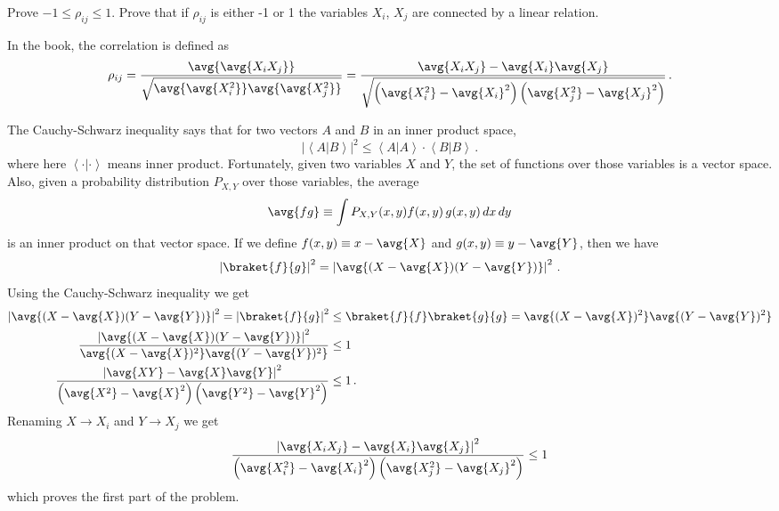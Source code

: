 

Prove $-1 \leq \rho_{ij} \leq 1$.
Prove that if $\rho_{ij}$ is either -1 or 1 the variables $X_i$, $X_j$ are connected by a linear relation.

In the book, the correlation is defined as
\begin{equation*}
\rho_{ij}
= \frac{\avg{\avg{X_i X_j}}}{\sqrt{\avg{\avg{X_i^2}} \avg{\avg{X_j^2}}}}
= \frac{\avg{X_i X_j}
- \avg{X_i}\avg{X_j}}{
\sqrt{\left(\avg{X_i^2} - \avg{X_i}^2 \right) \left( \avg{X_j^2} - \avg{X_j}^2 \right)}
} \, .
\end{equation*}


The Cauchy-Schwarz inequality says that for two vectors $A$ and $B$ in an inner product space,
\begin{equation*}
\left\lvert \left \langle A | B \right \rangle \right\vert ^2
\leq \left\langle A | A \right\rangle \cdot \left\langle B | B \right\rangle \, .
\end{equation*}
where here $\left \langle \cdot | \cdot \right \rangle$ means inner product.
Fortunately, given two variables $X$ and $Y$, the set of functions over those variables is a vector space.
Also, given a probability distribution $P_{X,Y}$ over those variables, the average \begin{equation*}
\avg{f g} \equiv \int P_{X,Y}(x, y) f(x, y) \, g(x, y) \, dx \, dy
\end{equation*}
is an inner product on that vector space.
If we define $f(x,y) \equiv x - \avg{X}$ and $g(x,y) \equiv y - \avg{Y}$, then we have
\begin{align*}
\left \lvert \braket{f}{g} \right \rvert^2
= \left \lvert \avg{(X - \avg{X})(Y - \avg{Y})} \right \rvert^2 \, .
\end{align*}
Using the Cauchy-Schwarz inequality we get
\begin{align*}
\left \lvert \avg{(X - \avg{X})(Y - \avg{Y})} \right \rvert^2
= \left \lvert \braket{f}{g} \right \rvert^2
&\leq \braket{f}{f} \braket{g}{g}
= \avg{(X - \avg{X})^2} \avg{(Y - \avg{Y})^2} \\
\frac{
\left \lvert \avg{(X - \avg{X})(Y - \avg{Y})} \right \rvert^2}
{
\avg{(X - \avg{X})^2} \avg{(Y - \avg{Y})^2}}
&\leq 1 \\
\frac{
\left \lvert \avg{XY} - \avg{X}\avg{Y} \right \rvert^2}
{
\left(\avg{X^2} - \avg{X}^2 \right) \left( \avg{Y^2} - \avg{Y}^2 \right)}
&\leq 1 \, .
\end{align*}
Renaming $X \rightarrow X_i$ and $Y \rightarrow X_j$ we get\
\begin{equation*}
\frac{
\left \lvert \avg{X_i X_j} - \avg{X_i}\avg{X_j} \right \rvert^2}
{
\left(\avg{X_i^2} - \avg{X_i}^2 \right) \left( \avg{X_j^2} - \avg{X_j}^2 \right)}
\leq 1
\end{equation*}
which proves the first part of the problem.

